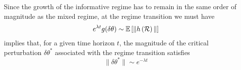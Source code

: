 Since the growth of the informative regime has to remain in the same order of magnitude as the mixed regime, at the regime transition we must have
\begin{equation}\label{eqSI:transitionBoundary_II}
    e^{\lambda t} g(\delta \theta) \sim {\ensuremath{\mathbb{E}}}\left[\|h\left(\mathcal{R}\right)\|\right]
\end{equation}
% 
 implies that, for a given time horizon $t$, the magnitude of the critical perturbation $\delta \theta^*$ associated with the regime transition satisfies
% 
\begin{equation}\label{eqSI:transitionBoundary}
    \|\delta \theta^*\| \sim e^{-\lambda t}
\end{equation}
% 


